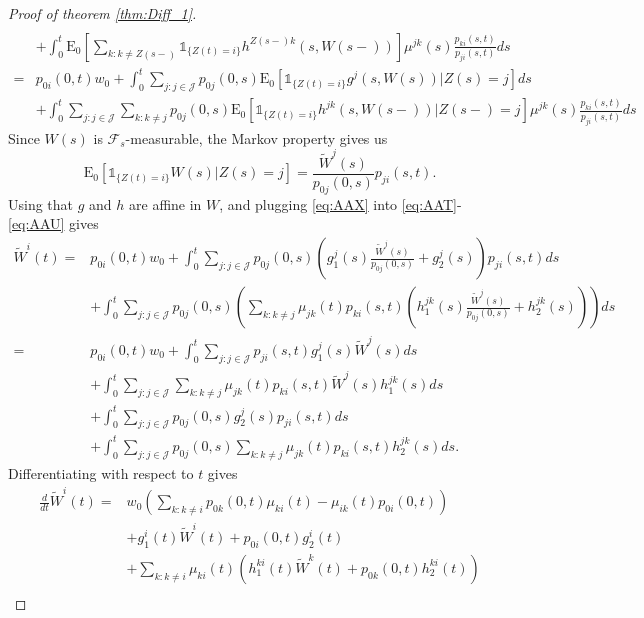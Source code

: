 \documentclass[12pt]{article}
\newcommand{\E}{\text{E}}
\newcommand{\indic}[1]{\mathds{1}_{ \{ #1 \} }}
\theoremstyle{my_thm}
\begin{document}
\begin{proof}[Proof of theorem \ref{thm:Diff_1}]
\begin{align}
\\
&+
\nonumber \int_0^t \E_0 \left[ \sum_{k:k \neq Z(s-)}  \indic{Z(t)=i} h^{Z(s-)k}(s,W(s-))\right] \mu^{jk}(s) \frac{p_{ki}(s,t)}{p_{ji}(s,t)}  ds
\\
=&
p_{0i}(0,t)w_0+
 \int_0^t \sum_{j:j \in \mathcal{J}} p_{0j}(0,s) \E_0 \left[ \indic{Z(t)=i} g^{j}(s,W(s))|Z(s)=j \right] ds \label{eq:AAT}
\\
&+
 \int_0^t  \sum_{j:j \in \mathcal{J}}  \sum_{k:k \neq j} p_{0j}(0,s) \E_0 \left[ \indic{Z(t)=i} h^{jk}(s,W(s-)) | Z(s-)=j \right] \mu^{jk}(s) \frac{p_{ki}(s,t)}{p_{ji}(s,t)}   ds \label{eq:AAU}
\end{align}
Since $W(s)$ is $\mathcal{F}_s$-measurable, the Markov property gives us
\begin{equation}
\E_0[\indic{Z(t)=i}W(s)|Z(s)=j]=\frac{\tilde{W}^j(s)}{p_{0j}(0,s)}p_{ji}(s,t). \label{eq:AAX}
\end{equation}
Using that $g$ and $h$ are affine in $W$, and plugging \eqref{eq:AAX} into \eqref{eq:AAT}-\eqref{eq:AAU} gives
\begin{align*}
\tilde{W}^i(t)=&p_{0i}(0,t)w_0+
\int_0^t \sum_{j:j \in \mathcal{J}} p_{0j}(0,s)\left(  g_1^j(s)\frac{\tilde{W}^j(s)}{p_{0j}(0,s)}+g^j_2(s)\right)p_{ji}(s,t) ds
\\
&+
\int_0^t \sum_{j:j \in \mathcal{J}} p_{0j}(0,s)  \left( \sum_{k:k \neq j}  \mu_{jk}(t)p_{ki}(s,t) \left(  h_1^{jk}(s) \frac{\tilde{W}^j(s)}{p_{0j}(0,s)} +h_2^{jk}(s)  \right) \right) ds
 \\
=&p_{0i}(0,t)w_0+
\int_0^t \sum_{j:j \in \mathcal{J}} p_{ji}(s,t) g_1^j(s) \tilde{W}^j(s) ds
\\
&+
\int_0^t \sum_{j:j \in \mathcal{J}} \sum_{k:k \neq j}  \mu_{jk}(t) p_{ki}(s,t) \tilde{W}^j(s) h^{jk}_1(s)  ds
\\
&+
\int_0^t \sum_{j:j \in \mathcal{J}} p_{0j}(0,s)g_2^j(s)p_{ji}(s,t) ds
\\
&+
\int_0^t \sum_{j:j \in \mathcal{J}} p_{0j}(0,s)  \sum_{k:k \neq j}  \mu_{jk}(t) p_{ki}(s,t)h^{jk}_2(s) ds.
\end{align*}
Differentiating with respect to $t$ gives
\begin{align*}
\frac{d}{dt}\tilde{W}^i(t)=&
w_0
\left(\sum_{k:k \neq i} p_{0k}(0,t)\mu_{ki}(t) - \mu_{ik}(t)p_{0i}(0,t)\right)
\\
&+
 g_1^i(t) \tilde{W}^i(t) +p_{0i}(0,t)g^i_2(t)\\
&+
\sum_{k:k \neq i} \mu_{ki}(t) \left(  h_1^{ki}(t) \tilde{W}^k(t) + p_{0k}(0,t)h^{ki}_2(t) \right)
\\

\end{align*}
\end{proof}
\end{document}
